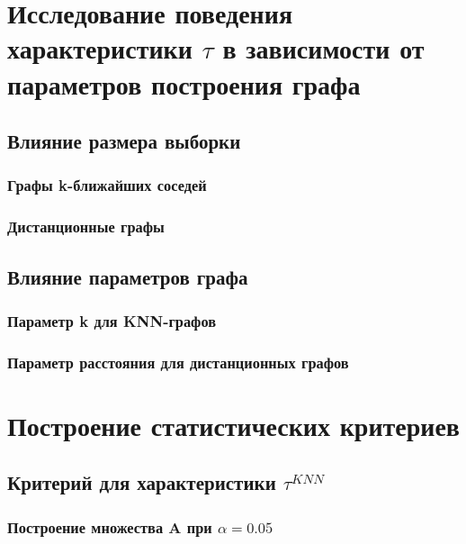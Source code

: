 \documentclass[a4paper,12pt]{report}
\begin{document}
\chapter{Исследование поведения характеристики $\tau$ в зависимости от параметров построения графа}

\section{Влияние размера выборки}

\subsection{Графы k-ближайших соседей}

\subsection{Дистанционные графы}

\section{Влияние параметров графа}

\subsection{Параметр k для KNN-графов}

\subsection{Параметр расстояния для дистанционных графов}

\chapter{Построение статистических критериев}

\section{Критерий для характеристики $\tau^{KNN}$}

\subsection{Построение множества A при $\alpha = 0.05$}
\end{document}
